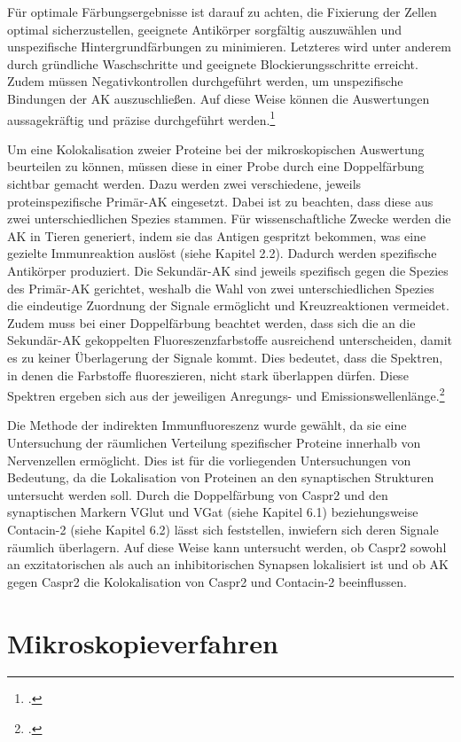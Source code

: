 Für optimale Färbungsergebnisse ist darauf zu achten, die Fixierung der
Zellen optimal sicherzustellen, geeignete Antikörper sorgfältig
auszuwählen und unspezifische Hintergrundfärbungen zu minimieren.
Letzteres wird unter anderem durch gründliche Waschschritte und
geeignete Blockierungsschritte erreicht. Zudem müssen Negativkontrollen
durchgeführt werden, um unspezifische Bindungen der AK
auszuschließen. Auf diese Weise können die Auswertungen aussagekräftig
und präzise durchgeführt
werden.\footcite{LeicaIHC2026}

Um eine Kolokalisation zweier Proteine bei der mikroskopischen
Auswertung beurteilen zu können, müssen diese in einer Probe durch eine
Doppelfärbung sichtbar gemacht werden. Dazu werden zwei verschiedene,
jeweils proteinspezifische Primär-AK eingesetzt. Dabei ist zu
beachten, dass diese aus zwei unterschiedlichen Spezies stammen. Für wissenschaftliche Zwecke werden die AK in Tieren generiert, indem sie das Antigen gespritzt bekommen, was eine gezielte Immunreaktion auslöst (siehe Kapitel 2.2). Dadurch werden spezifische Antikörper produziert. Die
Sekundär-AK sind jeweils spezifisch gegen die Spezies des
Primär-AK gerichtet, weshalb die Wahl von zwei
unterschiedlichen Spezies die eindeutige Zuordnung der Signale
ermöglicht und Kreuzreaktionen vermeidet. Zudem muss bei einer
Doppelfärbung beachtet werden, dass sich die an die Sekundär-AK
gekoppelten Fluoreszenzfarbstoffe ausreichend unterscheiden, damit
es zu keiner Überlagerung der Signale kommt. Dies bedeutet, dass die
Spektren, in denen die Farbstoffe fluoreszieren, nicht stark überlappen
dürfen. Diese Spektren ergeben sich aus der jeweiligen Anregungs- und
Emissionswellenlänge.\footcite{Hackenberg}

Die Methode der indirekten Immunfluoreszenz wurde gewählt, da sie eine
Untersuchung der räumlichen Verteilung spezifischer Proteine innerhalb von
Nervenzellen ermöglicht. Dies ist für die vorliegenden Untersuchungen von
Bedeutung, da die Lokalisation von Proteinen an den synaptischen Strukturen
untersucht werden soll. Durch die Doppelfärbung von Caspr2 und den synaptischen
Markern VGlut und VGat (siehe Kapitel 6.1) beziehungsweise Contacin-2 (siehe Kapitel 6.2) lässt sich feststellen, inwiefern
sich deren Signale räumlich überlagern. Auf diese Weise kann untersucht werden, ob
Caspr2 sowohl an exzitatorischen als auch an inhibitorischen Synapsen lokalisiert ist und
ob AK gegen Caspr2 die Kolokalisation von Caspr2 und Contacin-2
beeinflussen.

\section{Mikroskopieverfahren}

